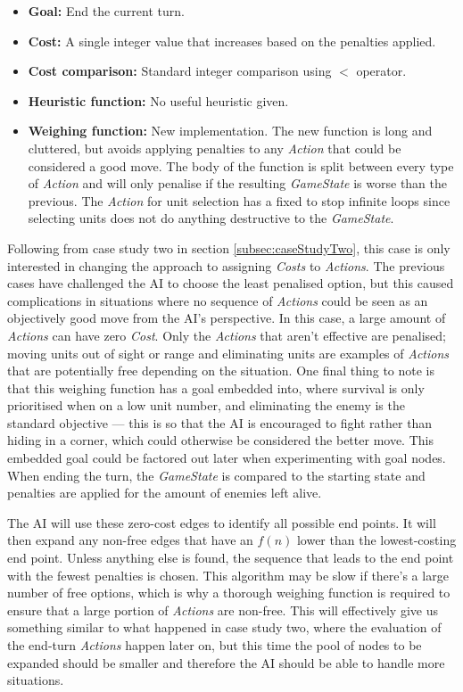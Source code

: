 \documentclass[11pt, a4paper]{report}
\begin{document}
\begin{itemize}
  \item \textbf{Goal:} End the current turn.
  \item \textbf{Cost:} A single integer value that increases based on the penalties applied.
  \item \textbf{Cost comparison:} Standard integer comparison using $<$ operator.
  \item \textbf{Heuristic function:} No useful heuristic given.
  \item \textbf{Weighing function:} New implementation. The new function is long and cluttered, but avoids applying penalties to any \emph{Action} that could be considered a good move. The body of the function is split between every type of \emph{Action} and will only penalise if the resulting \emph{GameState} is worse than the previous. The \emph{Action} for unit selection has a fixed to stop infinite loops since selecting units does not do anything destructive to the \emph{GameState}.
\end{itemize}

Following from case study two in section \ref{subsec:caseStudyTwo}, this case is only interested in changing the approach to assigning \emph{Costs} to \emph{Actions}. The previous cases have challenged the AI to choose the least penalised option, but this caused complications in situations where no sequence of \emph{Actions} could be seen as an objectively good move from the AI's perspective. In this case, a large amount of \emph{Actions} can have zero \emph{Cost}. Only the \emph{Actions} that aren't effective are penalised; moving units out of sight or range and eliminating units are examples of \emph{Actions} that are potentially free depending on the situation. One final thing to note is that this weighing function has a goal embedded into, where survival is only prioritised when on a low unit number, and eliminating the enemy is the standard objective --- this is so that the AI is encouraged to fight rather than hiding in a corner, which could otherwise be considered the better move. This embedded goal could be factored out later when experimenting with goal nodes. When ending the turn, the \emph{GameState} is compared to the starting state and penalties are applied for the amount of enemies left alive. 

The AI will use these zero-cost edges to identify all possible end points. It will then expand any non-free edges that have an $f(n)$ lower than the lowest-costing end point. Unless anything else is found, the sequence that leads to the end point with the fewest penalties is chosen. This algorithm may be slow if there's a large number of free options, which is why a thorough weighing function is required to ensure that a large portion of \emph{Actions} are non-free. This will effectively give us something similar to what happened in case study two, where the evaluation of the end-turn \emph{Actions} happen later on, but this time the pool of nodes to be expanded should be smaller and therefore the AI should be able to handle more situations.
\end{document}
